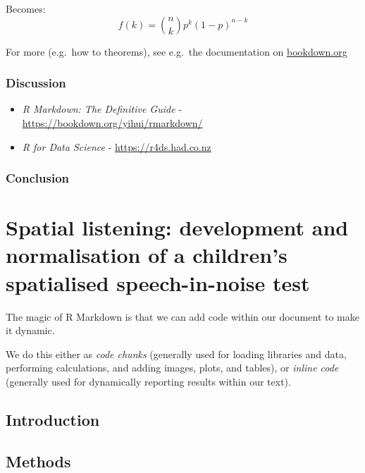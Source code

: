 \documentclass[a4paper, twoside]{templates/ociamthesis}
\begin{document}
Becomes:
\begin{equation}
f\left(k\right)=\binom{n}{k}p^k\left(1-p\right)^{n-k}
\label{eq:binom}
\end{equation}

For more (e.g.~how to theorems), see e.g.~the documentation on \href{https://bookdown.org/yihui/bookdown/markdown-extensions-by-bookdown.html\#equations}{bookdown.org}

\hypertarget{discussion-2}{%
\subsection{Discussion}\label{discussion-2}}

\begin{itemize}
\item
  \emph{R Markdown: The Definitive Guide} - \url{https://bookdown.org/yihui/rmarkdown/}
\item
  \emph{R for Data Science} - \url{https://r4ds.had.co.nz}
\end{itemize}

\hypertarget{conclusion}{%
\subsection{Conclusion}\label{conclusion}}

\hypertarget{Chpt2}{%
\chapter{Spatial listening: development and normalisation of a children's spatialised speech-in-noise test}\label{Chpt2}}

\minitoc 

The magic of R Markdown is that we can add code within our document to make it dynamic.

We do this either as \emph{code chunks} (generally used for loading libraries and data, performing calculations, and adding images, plots, and tables), or \emph{inline code} (generally used for dynamically reporting results within our text).

\hypertarget{introduction-3}{%
\section{Introduction}\label{introduction-3}}

\hypertarget{methods-3}{%
\section{Methods}\label{methods-3}}
\end{document}
